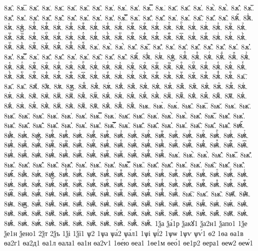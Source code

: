 {8ѫ̂.
8ѫ̅.
8ѫ̆.
8ѫ̇.
8ѫ̈.
8ѫ̋.
8ѫ̏.
8ѫ̑.
8ѫ̓.
8ѫ̔.
8ѫ̾.
8ѫ̿.
8ѫ͘.
8ѫ҃.
8ѫ҄.
8ѫ҅.
8ѫ҅̀.
8ѫ҅́.
8ѫ҅̂.
8ѫ҅̅.
8ѫ҅̆.
8ѫ҅̇.
8ѫ҅̈.
8ѫ҅̋.
8ѫ҅̏.
8ѫ҅̑.
8ѫ҅̓.
8ѫ҅̔.
8ѫ҅̾.
8ѫ҅̿.
8ѫ҅͘.
8ѫ҅҃.
8ѫ҅҄.
8ѫ҅҅.
8ѫ҅҆.
8ѫ҅҇.
8ѫ҅᷀.
8ѫ҅᷁.
8ѫ҅᷶.
8ѫ᷷҅.
8ѫ᷸҅.
8ѫ᷹҅.
8ѫ҅ⷠ.
8ѫ҅ⷡ.
8ѫ҅ⷢ.
8ѫ҅ⷣ.
8ѫ҅ⷤ.
8ѫ҅ⷥ.
8ѫ҅ⷦ.
8ѫ҅ⷧ.
8ѫ҅ⷨ.
8ѫ҅ⷩ.
8ѫ҅ⷪ.
8ѫ҅ⷫ.
8ѫ҅ⷬ.
8ѫ҅ⷭ.
8ѫ҅ⷮ.
8ѫ҅ⷯ.
8ѫ҅ⷰ.
8ѫ҅ⷱ.
8ѫ҅ⷲ.
8ѫ҅ⷳ.
8ѫ҅ⷴ.
8ѫ҅ⷵ.
8ѫ҅ⷶ.
8ѫ҅ⷷ.
8ѫ҅ⷸ.
8ѫ҅ⷹ.
8ѫ҅ⷺ.
8ѫ҅ⷻ.
8ѫ҅ⷼ.
8ѫ҅ⷽ.
8ѫ҅ⷾ.
8ѫ҅ⷿ.
8ѫ҅꙯.
8ѫ҅ꙴ.
8ѫ҅ꙵ.
8ѫ҅ꙶ.
8ѫ҅ꙷ.
8ѫ҅ꙸ.
8ѫ҅ꙹ.
8ѫ҅ꙺ.
8ѫ҅ꙻ.
8ѫ҅꙼.
8ѫ҅꙽.
8ѫ҅ꚞ.
8ѫ҅ꚟ.
8ѫ҆.
8ѫ҆̀.
8ѫ҆́.
8ѫ҆̂.
8ѫ҆̅.
8ѫ҆̆.
8ѫ҆̇.
8ѫ҆̈.
8ѫ҆̋.
8ѫ҆̏.
8ѫ҆̑.
8ѫ҆̓.
8ѫ҆̔.
8ѫ҆̾.
8ѫ҆̿.
8ѫ҆͘.
8ѫ҆҃.
8ѫ҆҄.
8ѫ҆҅.
8ѫ҆҆.
8ѫ҆҇.
8ѫ҆᷀.
8ѫ҆᷁.
8ѫ҆᷶.
8ѫ᷷҆.
8ѫ᷸҆.
8ѫ᷹҆.
8ѫ҆ⷠ.
8ѫ҆ⷡ.
8ѫ҆ⷢ.
8ѫ҆ⷣ.
8ѫ҆ⷤ.
8ѫ҆ⷥ.
8ѫ҆ⷦ.
8ѫ҆ⷧ.
8ѫ҆ⷨ.
8ѫ҆ⷩ.
8ѫ҆ⷪ.
8ѫ҆ⷫ.
8ѫ҆ⷬ.
8ѫ҆ⷭ.
8ѫ҆ⷮ.
8ѫ҆ⷯ.
8ѫ҆ⷰ.
8ѫ҆ⷱ.
8ѫ҆ⷲ.
8ѫ҆ⷳ.
8ѫ҆ⷴ.
8ѫ҆ⷵ.
8ѫ҆ⷶ.
8ѫ҆ⷷ.
8ѫ҆ⷸ.
8ѫ҆ⷹ.
8ѫ҆ⷺ.
8ѫ҆ⷻ.
8ѫ҆ⷼ.
8ѫ҆ⷽ.
8ѫ҆ⷾ.
8ѫ҆ⷿ.
8ѫ҆꙯.
8ѫ҆ꙴ.
8ѫ҆ꙵ.
8ѫ҆ꙶ.
8ѫ҆ꙷ.
8ѫ҆ꙸ.
8ѫ҆ꙹ.
8ѫ҆ꙺ.
8ѫ҆ꙻ.
8ѫ҆꙼.
8ѫ҆꙽.
8ѫ҆ꚞ.
8ѫ҆ꚟ.
8ѫ҇.
8ѫ᷀.
8ѫ᷁.
8ѫ᷶.
8ѫ᷷.
8ѫ᷸.
8ѫ᷹.
8ѫⷠ.
8ѫⷡ.
8ѫⷢ.
8ѫⷣ.
8ѫⷤ.
8ѫⷥ.
8ѫⷦ.
8ѫⷧ.
8ѫⷨ.
8ѫⷩ.
8ѫⷪ.
8ѫⷫ.
8ѫⷬ.
8ѫⷭ.
8ѫⷮ.
8ѫⷯ.
8ѫⷰ.
8ѫⷱ.
8ѫⷲ.
8ѫⷳ.
8ѫⷴ.
8ѫⷵ.
8ѫⷶ.
8ѫⷷ.
8ѫⷸ.
8ѫⷹ.
8ѫⷺ.
8ѫⷻ.
8ѫⷼ.
8ѫⷽ.
8ѫⷾ.
8ѫⷿ.
8ѫ꙯.
8ѫꙴ.
8ѫꙵ.
8ѫꙶ.
8ѫꙷ.
8ѫꙸ.
8ѫꙹ.
8ѫꙺ.
8ѫꙻ.
8ѫ꙼.
8ѫ꙽.
8ѫꚞ.
8ѫꚟ.
8ѭ.
8ѭ̀.
8ѭ́.
8ѭ̂.
8ѭ̅.
8ѭ̆.
8ѭ̇.
8ѭ̈.
8ѭ̋.
8ѭ̏.
8ѭ̑.
8ѭ̓.
8ѭ̔.
8ѭ̾.
8ѭ̿.
8ѭ͘.
8ѭ҃.
8ѭ҄.
8ѭ҅.
8ѭ҅̀.
8ѭ҅́.
8ѭ҅̂.
8ѭ҅̅.
8ѭ҅̆.
8ѭ҅̇.
8ѭ҅̈.
8ѭ҅̋.
8ѭ҅̏.
8ѭ҅̑.
8ѭ҅̓.
8ѭ҅̔.
8ѭ҅̾.
8ѭ҅̿.
8ѭ҅͘.
8ѭ҅҃.
8ѭ҅҄.
8ѭ҅҅.
8ѭ҅҆.
8ѭ҅҇.
8ѭ҅᷀.
8ѭ҅᷁.
8ѭ҅᷶.
8ѭ᷷҅.
8ѭ᷸҅.
8ѭ᷹҅.
8ѭ҅ⷠ.
8ѭ҅ⷡ.
8ѭ҅ⷢ.
8ѭ҅ⷣ.
8ѭ҅ⷤ.
8ѭ҅ⷥ.
8ѭ҅ⷦ.
8ѭ҅ⷧ.
8ѭ҅ⷨ.
8ѭ҅ⷩ.
8ѭ҅ⷪ.
8ѭ҅ⷫ.
8ѭ҅ⷬ.
8ѭ҅ⷭ.
8ѭ҅ⷮ.
8ѭ҅ⷯ.
8ѭ҅ⷰ.
8ѭ҅ⷱ.
8ѭ҅ⷲ.
8ѭ҅ⷳ.
8ѭ҅ⷴ.
8ѭ҅ⷵ.
8ѭ҅ⷶ.
8ѭ҅ⷷ.
8ѭ҅ⷸ.
8ѭ҅ⷹ.
8ѭ҅ⷺ.
8ѭ҅ⷻ.
8ѭ҅ⷼ.
8ѭ҅ⷽ.
8ѭ҅ⷾ.
8ѭ҅ⷿ.
8ѭ҅꙯.
8ѭ҅ꙴ.
8ѭ҅ꙵ.
8ѭ҅ꙶ.
8ѭ҅ꙷ.
8ѭ҅ꙸ.
8ѭ҅ꙹ.
8ѭ҅ꙺ.
8ѭ҅ꙻ.
8ѭ҅꙼.
8ѭ҅꙽.
8ѭ҅ꚞ.
8ѭ҅ꚟ.
8ѭ҆.
8ѭ҆̀.
8ѭ҆́.
8ѭ҆̂.
8ѭ҆̅.
8ѭ҆̆.
8ѭ҆̇.
8ѭ҆̈.
8ѭ҆̋.
8ѭ҆̏.
8ѭ҆̑.
8ѭ҆̓.
8ѭ҆̔.
8ѭ҆̾.
8ѭ҆̿.
8ѭ҆͘.
8ѭ҆҃.
8ѭ҆҄.
8ѭ҆҅.
8ѭ҆҆.
8ѭ҆҇.
8ѭ҆᷀.
8ѭ҆᷁.
8ѭ҆᷶.
8ѭ᷷҆.
8ѭ᷸҆.
8ѭ᷹҆.
8ѭ҆ⷠ.
8ѭ҆ⷡ.
8ѭ҆ⷢ.
8ѭ҆ⷣ.
8ѭ҆ⷤ.
8ѭ҆ⷥ.
8ѭ҆ⷦ.
8ѭ҆ⷧ.
8ѭ҆ⷨ.
8ѭ҆ⷩ.
8ѭ҆ⷪ.
8ѭ҆ⷫ.
8ѭ҆ⷬ.
8ѭ҆ⷭ.
8ѭ҆ⷮ.
8ѭ҆ⷯ.
8ѭ҆ⷰ.
8ѭ҆ⷱ.
8ѭ҆ⷲ.
8ѭ҆ⷳ.
8ѭ҆ⷴ.
8ѭ҆ⷵ.
8ѭ҆ⷶ.
8ѭ҆ⷷ.
8ѭ҆ⷸ.
8ѭ҆ⷹ.
8ѭ҆ⷺ.
8ѭ҆ⷻ.
8ѭ҆ⷼ.
8ѭ҆ⷽ.
8ѭ҆ⷾ.
8ѭ҆ⷿ.
8ѭ҆꙯.
8ѭ҆ꙴ.
8ѭ҆ꙵ.
8ѭ҆ꙶ.
8ѭ҆ꙷ.
8ѭ҆ꙸ.
8ѭ҆ꙹ.
8ѭ҆ꙺ.
8ѭ҆ꙻ.
8ѭ҆꙼.
8ѭ҆꙽.
8ѭ҆ꚞ.
8ѭ҆ꚟ.
8ѭ҇.
8ѭ᷀.
8ѭ᷁.
8ѭ᷶.
8ѭ᷷.
8ѭ᷸.
8ѭ᷹.
8ѭⷠ.
8ѭⷡ.
8ѭⷢ.
8ѭⷣ.
8ѭⷤ.
8ѭⷥ.
8ѭⷦ.
8ѭⷧ.
8ѭⷨ.
8ѭⷩ.
8ѭⷪ.
8ѭⷫ.
8ѭⷬ.
8ѭⷭ.
8ѭⷮ.
8ѭⷯ.
8ѭⷰ.
8ѭⷱ.
8ѭⷲ.
8ѭⷳ.
8ѭⷴ.
8ѭⷵ.
8ѭⷶ.
8ѭⷷ.
8ѭⷸ.
8ѭⷹ.
8ѭⷺ.
8ѭⷻ.
8ѭⷼ.
8ѭⷽ.
8ѭⷾ.
8ѭⷿ.
8ѭ꙯.
8ѭꙴ.
8ѭꙵ.
8ѭꙶ.
8ѭꙷ.
8ѭꙸ.
8ѭꙹ.
8ѭꙺ.
8ѭꙻ.
8ѭ꙼.
8ѭ꙽.
8ѭꚞ.
8ѭꚟ.
1ѯа
ѯа́1р
ѯакꙋ1
ѯа2н1
ѯапо1
1ѯе
ѯе1н
ѯено1
2ѯт
2ѯъ
1ѯі
1ѯї1
ѱ2
1ѱа
ѱа́2
ѱа́л1
1ѱі
ѱі́2
1ѱѡ
1ѱѵ
ѱѵ́1
ѳ2
1ѳа
ѳа1в
ѳа2г1
ѳа2д1
ѳа1л
ѳала1
ѳа1н
ѳа2ѵ1
1ѳе́ю
ѳеа1
1ѳе1м
ѳео́1
ѳе1р2
ѳера1
ѳеѡ2
ѳеѡ́1
}
